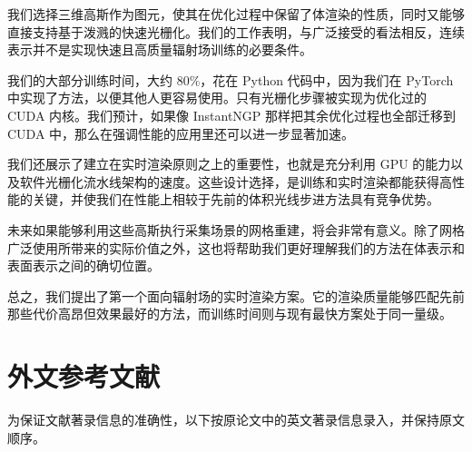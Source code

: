 我们选择三维高斯作为图元，使其在优化过程中保留了体渲染的性质，同时又能够直接支持基于泼溅的快速光栅化。我们的工作表明，与广泛接受的看法相反，连续表示并不是实现快速且高质量辐射场训练的必要条件。

我们的大部分训练时间，大约 \(80\%\)，花在 Python 代码中，因为我们在 PyTorch 中实现了方法，以便其他人更容易使用。只有光栅化步骤被实现为优化过的 CUDA 内核。我们预计，如果像 InstantNGP 那样把其余优化过程也全部迁移到 CUDA 中，那么在强调性能的应用里还可以进一步显著加速。

我们还展示了建立在实时渲染原则之上的重要性，也就是充分利用 GPU 的能力以及软件光栅化流水线架构的速度。这些设计选择，是训练和实时渲染都能获得高性能的关键，并使我们在性能上相较于先前的体积光线步进方法具有竞争优势。

未来如果能够利用这些高斯执行采集场景的网格重建，将会非常有意义。除了网格广泛使用所带来的实际价值之外，这也将帮助我们更好理解我们的方法在体表示和表面表示之间的确切位置。

总之，我们提出了第一个面向辐射场的实时渲染方案。它的渲染质量能够匹配先前那些代价高昂但效果最好的方法，而训练时间则与现有最快方案处于同一量级。

\section{外文参考文献}

为保证文献著录信息的准确性，以下按原论文中的英文著录信息录入，并保持原文顺序。
\begingroup
\makeatletter
\renewcommand{\@biblabel}[1]{[#1]}
\def\@lbibitem[#1]#2{%
    \item
    \if@filesw
        {\let\protect\noexpand
         \immediate\write\@auxout{\string\bibcite{#2}{\the\value{\@listctr}}}}%
    \fi
    \ignorespaces
}
\makeatother
\small
\sloppy

\endgroup

\begingroup
    \printbibliography[title={本章引用文献}]
\endgroup
